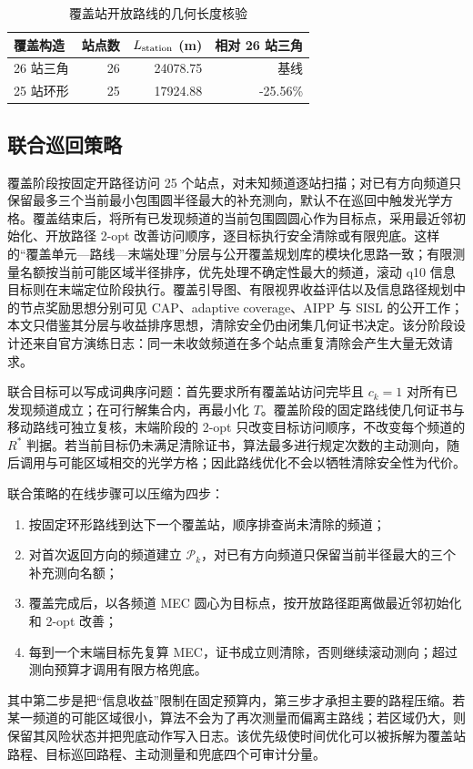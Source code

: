 \begin{table}[H]\centering\small
\caption{覆盖站开放路线的几何长度核验}\label{tab:q4-route-length}
\begin{tabular}{lrrr}
\toprule
覆盖构造 & 站点数 & $L_{\rm station}$ (m) & 相对 26 站三角 \\
\midrule
26 站三角 & 26 & 24078.75 & 基线 \\
25 站环形 & 25 & 17924.88 & -25.56\% \\
\bottomrule
\end{tabular}
\end{table}

\subsection{联合巡回策略}
覆盖阶段按固定开路径访问 25 个站点，对未知频道逐站扫描；对已有方向频道只保留最多三个当前最小包围圆半径最大的补充测向，默认不在巡回中触发光学方格。覆盖结束后，将所有已发现频道的当前包围圆圆心作为目标点，采用最近邻初始化、开放路径 2-opt 改善访问顺序，逐目标执行安全清除或有限兜底。这样的“覆盖单元—路线—末端处理”分层与公开覆盖规划库的模块化思路一致\cite{fields2cover,opennav,coverage}；有限测量名额按当前可能区域半径排序，优先处理不确定性最大的频道，滚动 q10 信息目标则在末端定位阶段执行。覆盖引导图、有限视界收益评估以及信息路径规划中的节点奖励思想分别可见 CAP、adaptive coverage、AIPP 与 SISL 的公开工作\cite{cap,adaptivecoverage,aipp,sisl}；本文只借鉴其分层与收益排序思想，清除安全仍由闭集几何证书决定。该分阶段设计还来自官方演练日志：同一未收敛频道在多个站点重复清除会产生大量无效请求。

联合目标可以写成词典序问题：首先要求所有覆盖站访问完毕且 $c_k=1$ 对所有已发现频道成立；在可行解集合内，再最小化 $T$。覆盖阶段的固定路线使几何证书与移动路线可独立复核，末端阶段的 2-opt 只改变目标访问顺序，不改变每个频道的 $R^*$ 判据。若当前目标仍未满足清除证书，算法最多进行规定次数的主动测向，随后调用与可能区域相交的光学方格；因此路线优化不会以牺牲清除安全性为代价。

联合策略的在线步骤可以压缩为四步：
\begin{enumerate}
\item 按固定环形路线到达下一个覆盖站，顺序排查尚未清除的频道；
\item 对首次返回方向的频道建立 $\mathcal P_k$，对已有方向频道只保留当前半径最大的三个补充测向名额；
\item 覆盖完成后，以各频道 MEC 圆心为目标点，按开放路径距离做最近邻初始化和 2-opt 改善；
\item 每到一个末端目标先复算 MEC，证书成立则清除，否则继续滚动测向；超过测向预算才调用有限方格兜底。
\end{enumerate}
其中第二步是把“信息收益”限制在固定预算内，第三步才承担主要的路程压缩。若某一频道的可能区域很小，算法不会为了再次测量而偏离主路线；若区域仍大，则保留其风险状态并把兜底动作写入日志。该优先级使时间优化可以被拆解为覆盖站路程、目标巡回路程、主动测量和兜底四个可审计分量。


